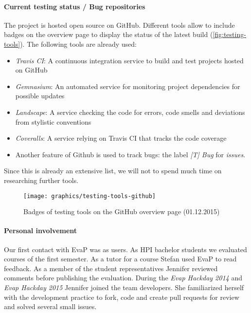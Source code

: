 \paragraph{Current testing status / Bug repositories}
The project is hosted open source on GitHub.
Different tools allow to include badges on the overview page to display the status of the latest build (\autoref{fig:testing-tools}).
The following tools are already used:
\begin{itemize}
    \item \emph{Travis CI}: 
    A continuous integration service to build and test projects hosted on GitHub
    \item \emph{Gemnasium}:
     An automated service for monitoring project dependencies for possible updates
     \item \emph{Landscape}:
     A service checking the code for errors, code smells and deviations from stylistic conventions
     \item  \emph{Coveralls}:
     A service relying on Travis CI that tracks the code coverage
     \item 
     Another feature of Github is used to track bugs: the label \emph{[T] Bug} for \emph{issues}.
\end{itemize}
Since this is already an extensive list, we will not to spend much time on researching further tools. 
\begin{figure}[h]
    \centering
    \texttt{[image: graphics/testing-tools-github]}
    \caption{Badges of testing tools on the GitHub overview page (01.12.2015)}
    \label{fig:testing-tools}
\end{figure}


\paragraph{Personal involvement}
Our first contact with EvaP was as users. 
As HPI bachelor students we evaluated courses of the first semester.
As a tutor for a course Stefan used EvaP to read feedback.
As a member of the student representatives Jennifer reviewed comments before publishing the evaluation.
During the \emph{Evap Hackday 2014} and \emph{Evap Hackday 2015} Jennifer joined the team developers.
She familiarized herself with the development practice to fork, code and create pull requests for review and solved several small issues.
